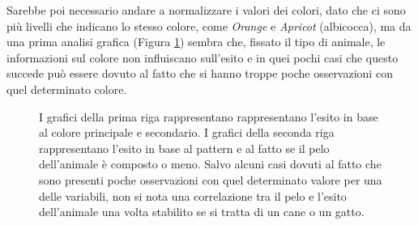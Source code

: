 Sarebbe poi necessario andare a normalizzare i valori dei colori, dato che ci sono più livelli che indicano lo stesso colore, come \textit{Orange} e \textit{Apricot} (albicocca), ma da una prima analisi grafica (Figura \ref{fig-colors}) sembra che, fissato il tipo di animale, le informazioni sul colore non influiscano sull'esito e in quei pochi casi che questo succede può essere dovuto al fatto che si hanno troppe poche osservazioni con quel determinato colore.

\begin{figure}[!ht]
	\centering
	\quad
	
	\quad
	\caption{I grafici della prima riga rappresentano rappresentano l'esito in base al colore principale e secondario. I grafici della seconda riga rappresentano l'esito in base al pattern e al fatto se il pelo dell'animale è composto o meno. Salvo alcuni casi dovuti al fatto che sono presenti poche osservazioni con quel determinato valore per una delle variabili, non si nota una correlazione tra il pelo e l'esito dell'animale una volta stabilito se si tratta di un cane o un gatto.}
	\label{fig-colors}
\end{figure}

